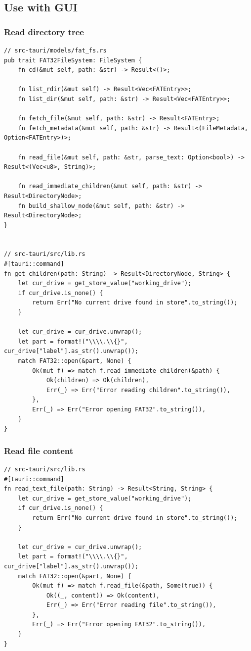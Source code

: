 \documentclass[a4paper,12pt]{report}
\begin{document}
\subsection{Use with GUI}
\subsubsection*{Read directory tree}
\begin{verbatim}
// src-tauri/models/fat_fs.rs
pub trait FAT32FileSystem: FileSystem {
    fn cd(&mut self, path: &str) -> Result<()>;

    fn list_rdir(&mut self) -> Result<Vec<FATEntry>>;
    fn list_dir(&mut self, path: &str) -> Result<Vec<FATEntry>>;

    fn fetch_file(&mut self, path: &str) -> Result<FATEntry>;
    fn fetch_metadata(&mut self, path: &str) -> Result<(FileMetadata, Option<FATEntry>)>;

    fn read_file(&mut self, path: &str, parse_text: Option<bool>) -> Result<(Vec<u8>, String)>;

    fn read_immediate_children(&mut self, path: &str) -> Result<DirectoryNode>;
    fn build_shallow_node(&mut self, path: &str) -> Result<DirectoryNode>;
}


// src-tauri/src/lib.rs
#[tauri::command]
fn get_children(path: String) -> Result<DirectoryNode, String> {
    let cur_drive = get_store_value("working_drive");
    if cur_drive.is_none() {
        return Err("No current drive found in store".to_string());
    }

    let cur_drive = cur_drive.unwrap();
    let part = format!("\\\\.\\{}", cur_drive["label"].as_str().unwrap());
    match FAT32::open(&part, None) {
        Ok(mut f) => match f.read_immediate_children(&path) {
            Ok(children) => Ok(children),
            Err(_) => Err("Error reading children".to_string()),
        },
        Err(_) => Err("Error opening FAT32".to_string()),
    }
}
\end{verbatim}
\subsubsection*{Read file content}
\begin{verbatim}
// src-tauri/src/lib.rs
#[tauri::command]
fn read_text_file(path: String) -> Result<String, String> {
    let cur_drive = get_store_value("working_drive");
    if cur_drive.is_none() {
        return Err("No current drive found in store".to_string());
    }

    let cur_drive = cur_drive.unwrap();
    let part = format!("\\\\.\\{}", cur_drive["label"].as_str().unwrap());
    match FAT32::open(&part, None) {
        Ok(mut f) => match f.read_file(&path, Some(true)) {
            Ok((_, content)) => Ok(content),
            Err(_) => Err("Error reading file".to_string()),
        },
        Err(_) => Err("Error opening FAT32".to_string()),
    }
}
\end{verbatim}
\end{document}
